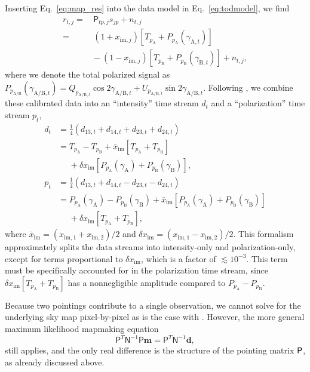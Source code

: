 \documentclass[twocolumn]{aa}
\newcommand{\A}[0]{\mathrm{A}}
\newcommand{\B}[0]{\mathrm{B}}
\renewcommand{\P}[0]{\tens{P}}
\begin{document}
Inserting Eq.~\eqref{eq:map_res} into the data model in
Eq.~\eqref{eq:todmodel}, we find 
\begin{align}
	r_{t,j}=&\,\mathsf P_{tp,j}s_{jp}+n_{t,j}
	\\
	=&\,(1+x_{\mathrm{im},j})[T_{p_\A}+P_{p_\A}(\gamma_{\A,t})]
	\nonumber
	\\
	&\!\!\!\!\!-(1-x_{\mathrm{im},j})[T_{p_\B}+P_{p_\B}(\gamma_{\B,t})]
	+n_{t,j},
	\label{eq:skymodel}
\end{align}
where we denote the total polarized signal as
${P_{p_{\A/\B}}(\gamma_{\A/\B,t})=Q_{p_{\A/\B,t}}\cos2\gamma_{\A/\B,t}
+U_{p_{\A/\B,t}}\sin2\gamma_{\A/\B,t}}$. Following \citet{jarosik2010},
we combine these calibrated data into an ``intensity'' time stream $d_t$
and a ``polarization'' time stream $p_t$,
\begin{align}
	d_t&=\frac14(d_{13,t}+d_{14,t}+d_{23,t}+d_{24,t})
	\\
	&=T_{p_\A}-T_{p_\B}
	+\bar x_\mathrm{im}[T_{p_\A}+T_{p_\B}]
	\nonumber
	\\
	&\,\,\,\,\,\,\,\,+\delta x_\mathrm{im}[P_{p_\A}(\gamma_\A)+P_{p_\B}(\gamma_\B)],
	\\
	p_t&=\frac14(d_{13,t}+d_{14,t}-d_{23,t}-d_{24,t})
	\\
	&=P_{p_\A}(\gamma_{\A})-P_{p_\B}(\gamma_{\B})
	+\bar x_\mathrm{im}[P_{p_\A}(\gamma_{\A})+P_{p_\B}(\gamma_{\B})]
	\nonumber
	\\
	&\,\,\,\,\,\,\,\,+\delta x_\mathrm{im}[T_{p_\A}+T_{p_\B}],
\end{align}
where $\bar x_\mathrm{im}=(x_\mathrm{im,1}+x_\mathrm{im,2})/2$ and $\delta
x_\mathrm{im}=(x_\mathrm{im,1}-x_\mathrm{im,2})/2$.  This formalism
approximately splits the data streams into intensity-only and
polarization-only, except for terms proportional to $\delta x_\mathrm{im}$,
which is a factor of $\lesssim10^{-3}$. This term must be specifically
accounted for in the polarization time stream, since $\delta
x_\mathrm{im}[T_{p_\A}+T_{p_\B}]$ has a nonnegligible amplitude compared to
$P_{p_\A}-P_{p_\B}$.

Because two pointings contribute to a single observation, we cannot
solve for the underlying sky map pixel-by-pixel as is the case with
\Planck. However, the more general maximum likelihood mapmaking equation
\begin{equation}
	\mathsf P^T\mathsf N^{-1}\mathsf P\boldsymbol m=\mathsf P^T\mathsf N^{-1}\boldsymbol d,
\end{equation}
still applies, and the only real difference is the structure of the pointing matrix $\P$,
as already discussed above.
\end{document}
